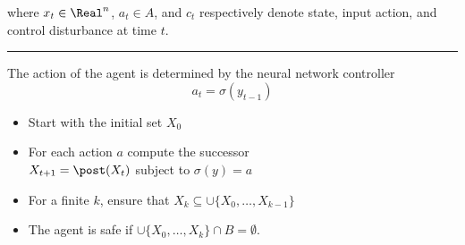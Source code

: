 \documentclass[a0paper,fleqn]{betterposter}
\begin{document}
{\begin{tcolorbox}
where $x_t \in \Real^n$, $a_t \in A$, and $c_t$
respectively denote state, input action, and control
disturbance at time $t$.\\
\vspace{7mm}
\textcolor{oxfordblue}{\rule{\textwidth}{3mm}}
The action of the agent is determined by the neural network controller
$$a_t = \sigma(y_{t-1})$$
\end{tcolorbox}

\vspace{15mm}
\begin{tcolorbox}[breakable,colback=white,colframe=oxfordblue,width=\dimexpr\textwidth+12mm\relax,enlarge left by=-6mm,boxrule=3mm,title=\textbf{Algorithm in Short},titlerule=5mm,arc=3mm,toptitle=5mm,bottomtitle=5mm,boxsep=5mm]
\begin{itemize}
    \item Start with the initial set $X_0$
    \item For each action $a$ compute the successor \\ $X_{t+1} = \post(X_t)$ subject to $\sigma(y) = a$
    \item For a finite $k$, ensure that $X_k \subseteq \cup \{ X_0, \dots, X_{k-1} \}$
    \item The agent is safe if $\cup \{ X_0, \dots, X_k \} \cap B = \emptyset$.
	\end{itemize}
\end{tcolorbox}
}{
\vspace{-5mm}
\begin{tcolorbox}[breakable,colback=white,colframe=oxfordblue,width=\dimexpr\textwidth+12mm\relax,enlarge left by=-6mm,boxrule=3mm,title=\textbf{Example problem},titlerule=5mm,arc=3mm,toptitle=5mm,bottomtitle=5mm,boxsep=5mm]



\end{tcolorbox}}
\end{document}
